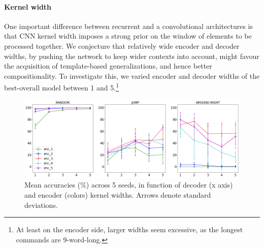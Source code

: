 \paragraph{Kernel width}
\label{subsec:exp2}

One important difference between recurrent and a convolutional
architectures is that CNN kernel
width imposes a strong prior on the window of elements to be
processed together. We conjecture that relatively wide encoder and
decoder widths, by pushing the network to keep wider
contexts into account, might favour the acquisition of template-based
generalizations, and hence better compositionality. To investigate
this, we varied encoder and decoder widths of the best-overall model
between 1 and 5.\footnote{At least on the encoder side, larger widths
  seem excessive, as the longest commands are 9-word-long.}


\begin{figure}[tb]
    \centering
    \includegraphics[width=\textwidth,keepaspectratio]{figures/kernel_exp.png}
    \caption{Mean accuracies (\%) across 5 seeds, in function of decoder (x axis) and encoder (colors) kernel widths. Arrows denote standard deviations.
    }
    \label{fig:kernel_exp}
\end{figure}

